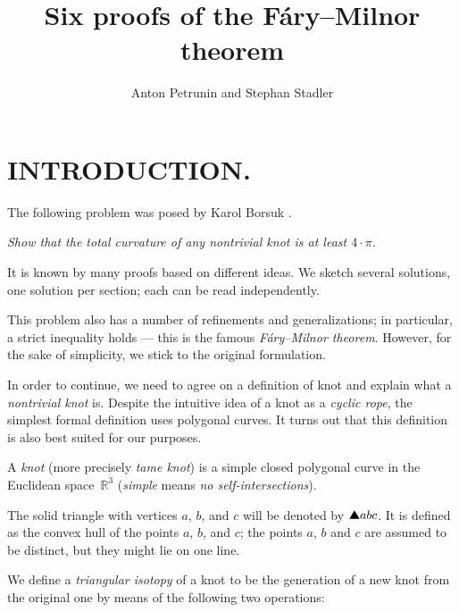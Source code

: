 \documentclass{article}
\theoremstyle{theorem}
\newtheorem{Crofton-type formula}[theorem]{Crofton-type formula}
\newtheorem{Douglas--Rado theorem}[theorem]{Douglas--Rado theorem}
\newtheorem{Extended monotonicity theorem}[theorem]{Extended monotonicity theorem}
\theoremstyle{definition}
\def\solidtriangle{\text{\ding{115}}}
\begin{document}
\newcommand{\amm}[2]{#2}

\title{%
Six proofs of the Fáry--Milnor theorem}
\author{Anton Petrunin and Stephan Stadler}

\date{}
\maketitle

\section*{INTRODUCTION.}

The following problem was posed by Karol Borsuk \cite{borsuk}.

\smallskip

\textit{Show that the total curvature of any nontrivial knot is at least $4{\cdot}\pi$.}

\smallskip

It is known by many proofs based on different ideas.
We sketch several solutions, one solution per section;
each can be read independently.

This problem also has a number of refinements and generalizations;
in particular, a strict inequality holds --- this is the famous \emph{Fáry--Milnor theorem}.
However, for the sake of simplicity, we stick to the original formulation.

In order to continue, we need to agree on a definition of knot and explain what a \emph{nontrivial knot} is.
Despite the intuitive idea of a knot as a \emph{cyclic rope},
the simplest formal definition uses polygonal curves.
It turns out that this definition is also best suited for our purposes.

A \emph{knot} (more precisely \emph{tame knot}) is a simple closed polygonal curve in the Euclidean space~$\mathbb{R}^3$ (\emph{simple} means \emph{no self-intersections}).

The solid triangle with vertices $a$, $b$, and $c$ will be denoted by $\solidtriangle abc$.
It is defined as the convex hull of the points $a$, $b$, and $c$;
the points $a$, $b$ and $c$ are assumed to be distinct, but they might lie on one line.

We define a \emph{triangular isotopy} of a knot to be the generation of a new knot from the original one by means of the
following two operations:
\end{document}
